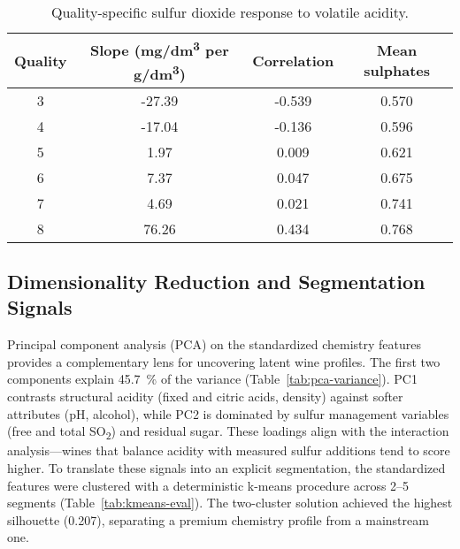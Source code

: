 \documentclass[11pt]{article}
\begin{document}
\begin{table}[H]
  \centering
  \caption{Quality-specific sulfur dioxide response to volatile acidity.}
  \label{tab:quality-sulfur-response}
  \begin{tabular}{c S[table-format=3.2] S[table-format=1.3] S[table-format=1.3]}
    \toprule
    Quality & {Slope (mg/dm\textsuperscript{3} per g/dm\textsuperscript{3})} & {Correlation} & {Mean sulphates} \\
     & -27.39 & -0.539 & 0.570 \\
    4 & -17.04 & -0.136 & 0.596 \\
    5 & 1.97 & 0.009 & 0.621 \\
    6 & 7.37 & 0.047 & 0.675 \\
    7 & 4.69 & 0.021 & 0.741 \\
    8 & 76.26 & 0.434 & 0.768 \\
    \bottomrule
  \end{tabular}
\end{table}

\subsection{Dimensionality Reduction and Segmentation Signals}
Principal component analysis (PCA) on the standardized chemistry features
provides a complementary lens for uncovering latent wine profiles. The first two
components explain \SI{45.7}{\percent} of the variance (Table~\ref{tab:pca-variance}).
PC1 contrasts structural acidity (fixed and citric acids, density) against
softer attributes (pH, alcohol), while PC2 is dominated by sulfur management
variables (free and total SO\textsubscript{2}) and residual sugar. These loadings
align with the interaction analysis---wines that balance acidity with measured
sulfur additions tend to score higher. To translate these signals into an
explicit segmentation, the standardized features were clustered with a
deterministic k-means procedure across \numrange{2}{5} segments
(Table~\ref{tab:kmeans-eval}). The two-cluster solution achieved the highest
silhouette (0.207), separating a premium chemistry profile from a mainstream
one.
\end{document}
